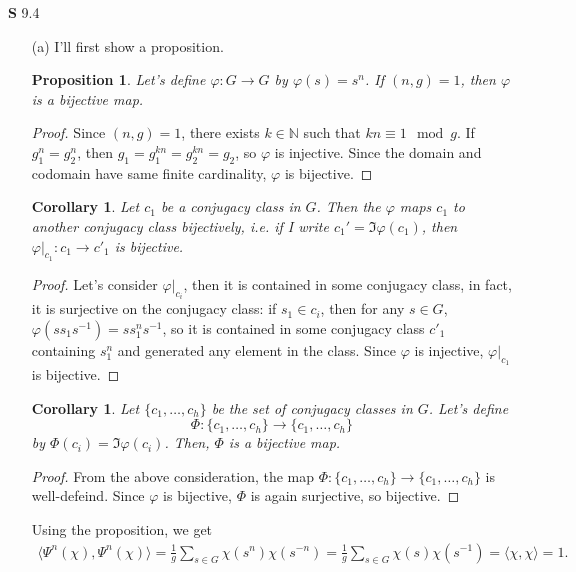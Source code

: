 \documentclass[a4paper, 12pt]{article}
\theoremstyle{Mydefinition}
\theoremstyle{Mytheorem}
\newtheorem{corollary}[statement]{Corollary}
\newtheorem{proposition}[statement]{Proposition}
\begin{document}
\noindent \textbf{S} 9.4
\begin{enumerate}
    \item[(a)]I'll first show a proposition.
\begin{proposition}\label{HW10:Prop:1}
Let's define $\varphi:G\rightarrow G$ by $\varphi(s) = s^n$. If $(n,g)=1$, then $\varphi$ is a bijective map.
\end{proposition}
\begin{proof}
Since $(n,g)=1$, there exists $k\in \mathbb{N}$ such that $kn\equiv 1\mod g$. If $g_1^n = g_2^n$, then $g_1=g_1^{kn}=g_2^{kn}=g_2$, so $\varphi$ is injective. Since the domain and codomain have same finite cardinality, $\varphi$ is bijective.
\end{proof}
\begin{corollary}\label{HW10:Cor:1}
Let $c_1$ be a conjugacy class in $G$. Then the $\varphi$ maps $c_1$ to another conjugacy class bijectively, i.e. if I write $c_1' = \Im\varphi(c_1)$, then $\varphi|_{c_1}:c_1\rightarrow c'_1$ is bijective.
\end{corollary}
\begin{proof}
Let's consider $\varphi|_{c_i}$, then it is contained in some conjugacy class, in fact, it is surjective on the conjugacy class: if $s_1\in c_i$, then for any $s\in G$, $\varphi(ss_1s^{-1}) = ss_1^ns^{-1}$, so it is contained in some conjugacy class $c'_1$ containing $s_1^n$ and generated any element in the class. Since $\varphi$ is injective, $\varphi|_{c_1}$ is bijective.
\end{proof}
\begin{corollary}\label{HW10:Cor:2}
Let $\{c_1, \ldots, c_h\}$ be the set of conjugacy classes in $G$. Let's define \begin{equation}
    \Phi:\{c_1, \ldots, c_h\}\rightarrow \{c_1, \ldots, c_h\}
\end{equation}
by $\Phi(c_i) = \Im\varphi(c_i)$. Then, $\Phi$ is a bijective map.
\end{corollary}
\begin{proof}
From the above consideration, the map $\Phi:\{c_1, \ldots, c_h\}\rightarrow \{c_1, \ldots, c_h\}$ is well-defeind. Since $\varphi$ is bijective, $\Phi$ is again surjective, so bijective.
\end{proof}
Using the proposition, we get
\begin{equation}
\begin{split}
    \langle \Psi^n(\chi),\Psi^n(\chi)\rangle = \frac{1}{g}\sum_{s\in G}\chi(s^n)\chi(s^{-n}) = \frac{1}{g}\sum_{s\in G}\chi(s)\chi(s^{-1}) = \langle \chi, \chi\rangle = 1.

\end{split}
\end{equation}
\end{enumerate}
\end{document}
